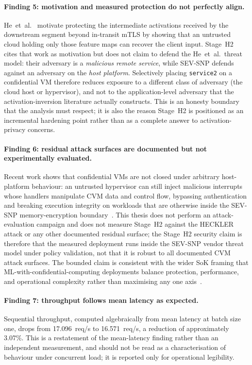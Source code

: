 \paragraph{Finding 5: motivation and measured protection do not perfectly
align.}
He~et~al.~\cite{he2021_attacking_collaborative} motivate protecting the
intermediate activations received by the downstream segment beyond
in-transit mTLS by showing that an untrusted cloud holding only those
feature maps can recover the client input. Stage~H2 cites that work as
motivation but does not claim to defend the He~et~al.\ threat model:
their adversary is a \emph{malicious remote service}, while SEV-SNP
defends against an adversary on the \emph{host platform}. Selectively
placing \texttt{service2} on a confidential VM therefore reduces
exposure to a different class of adversary (the cloud host or
hypervisor), and not to the application-level adversary that the
activation-inversion literature actually constructs. This is an honesty
boundary that the analysis must respect; it is also the reason Stage~H2 is
positioned as an incremental hardening point rather than as a complete
answer to activation-privacy concerns.

\paragraph{Finding 6: residual attack surfaces are documented but not
experimentally evaluated.}
Recent work shows that confidential VMs are not closed under arbitrary
host-platform behaviour: an untrusted hypervisor can still inject
malicious interrupts whose handlers manipulate CVM data and control flow,
bypassing authentication and breaking execution integrity on workloads
that are otherwise inside the SEV-SNP memory-encryption
boundary~\cite{schluter2024_heckler}. This thesis does not perform an
attack-evaluation campaign and does not measure Stage~H2 against the
HECKLER attack or any other documented residual surface; the Stage~H2
security claim is therefore that the measured deployment runs inside the
SEV-SNP vendor threat model under policy validation, not that it is
robust to all documented CVM attack surfaces. The bounded claim is
consistent with the wider SoK framing that ML-with-confidential-computing
deployments balance protection, performance, and operational complexity
rather than maximising any one axis~\cite{mo2024_ml_confidential_computing}.

\paragraph{Finding 7: throughput follows mean latency as expected.}
Sequential throughput, computed algebraically from mean latency at batch
size one, drops from 17.096~req/s to 16.571~req/s, a reduction of
approximately 3.07\%. This is a restatement of the mean-latency finding
rather than an independent measurement, and should not be read as a
characterisation of behaviour under concurrent load; it is reported only
for operational legibility.

